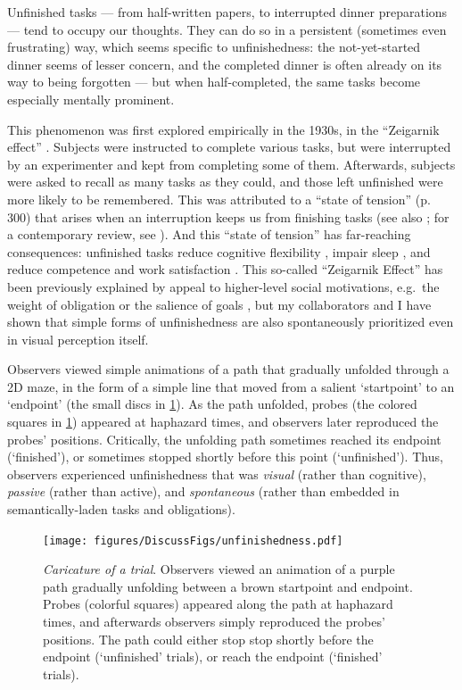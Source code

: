 Unfinished tasks — from half-written papers, to interrupted dinner preparations --- tend to occupy our thoughts.  They can do so in a persistent (sometimes even frustrating) way, which seems specific to unfinishedness: the not-yet-started dinner seems of lesser concern, and the completed dinner is often already on its way to being forgotten — but when half-completed, the same tasks become especially mentally prominent. 

This phenomenon was first explored empirically in the 1930s, in the “Zeigarnik effect” \parencite{ellis_finished_1938}.  Subjects were instructed to complete various tasks, but were interrupted by an experimenter and kept from completing some of them.  Afterwards, subjects were asked to recall as many tasks as they could, and those left unfinished were more likely to be remembered.  This was attributed to a “state of tension” (p. 300) that arises when an interruption keeps us from finishing tasks (see also \cite{baddeley_zeigarnik-like_1963}; for a contemporary review, see \cite{macleod_zeigarnik_2020}).  And this “state of tension” has far-reaching consequences: unfinished tasks reduce cognitive flexibility \parencite{freeman_dont_2010}, impair sleep \parencite{syrek_unfinished_2014}, and reduce competence and work satisfaction \parencite{weigelt_finding_2019}.  This so-called “Zeigarnik Effect” has been previously explained by appeal to higher-level social motivations, e.g.~the weight of obligation or the salience of goals \parencite{eitam_motivated_2013, ferguson_mind_2013}, but my collaborators and I have shown that simple forms of unfinishedness are also spontaneously prioritized even in visual perception itself.  

Observers viewed simple animations of a path that gradually unfolded through a 2D maze, in the form of a simple line that moved from a salient ‘startpoint’ to an ‘endpoint’ (the small discs in \cref{fig:DiscussFig_2}).  As the path unfolded, probes (the colored squares in \cref{fig:DiscussFig_2}) appeared at haphazard times, and observers later reproduced the probes’ positions. Critically, the unfolding path sometimes reached its endpoint (‘finished’), or sometimes stopped shortly before this point (‘unfinished’).  Thus, observers experienced unfinishedness that was \textit{visual} (rather than cognitive), \textit{passive} (rather than active), and \textit{spontaneous} (rather than embedded in semantically-laden tasks and obligations).  
\begin{figure}
    \centering
    \texttt{[image: figures/DiscussFigs/unfinishedness.pdf]}
    \caption
    {\textit{Caricature of a trial}. Observers viewed an animation of a purple path gradually unfolding between a brown startpoint and endpoint.  Probes (colorful squares) appeared along the path at haphazard times, and afterwards observers simply reproduced the probes’ positions. The path could either stop stop shortly before the endpoint (‘unfinished’ trials), or reach the endpoint (‘finished’ trials).}
    \label{fig:DiscussFig_2}
\end{figure}

